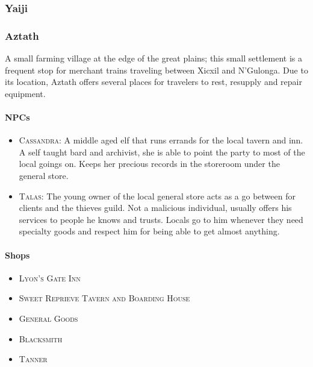		\subsubsection{Yaiji}

		\subsubsection{Aztath}

		A small farming village at the edge of the great plains; this small 
		settlement is a frequent stop for merchant trains traveling between 
		Xicxil and N'Gulonga.  Due to its location, Aztath offers several 
		places for travelers to rest, resupply and repair equipment.  

			\paragraph{NPCs}
			
				\begin{itemize}
					\item \textsc{Cassandra}: A middle aged elf that runs 
							errands for the local tavern and inn.
							A self taught bard and archivist, she
							is able to point the party to most of
							the local goings on.  Keeps her precious
							records in the storeroom under the
							general store. 
					\item \textsc{Talas}: The young owner of the local
							general store acts as a 
							go between for clients and the thieves 
							guild.  Not a malicious individual,
							usually offers his services to people he
							knows and trusts.  Locals go to him whenever 
							they need specialty goods and respect him
							for being able to get almost anything.  
				\end{itemize}
			\paragraph{Shops}

				\begin{itemize}
					\item \textsc{Lyon's Gate Inn}
					\item \textsc{Sweet Reprieve Tavern and Boarding House}
					\item \textsc{General Goods}
					\item \textsc{Blacksmith}
					\item \textsc{Tanner}
				\end{itemize}

